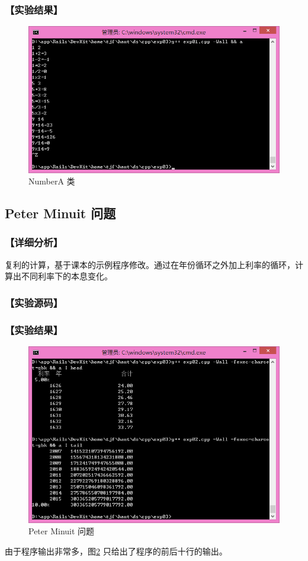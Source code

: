 \subsubsection*{【实验结果】}
\begin{figure}[htp]
\centering
\includegraphics[width=\textwidth]{exp03/exp01.png}
\caption{\label{out03_01}NumberA 类}
\end{figure}

\subsection{Peter Minuit 问题}
\subsubsection*{【详细分析】}
复利的计算，基于课本的示例程序修改。通过在年份循环之外加上利率的循环，计算出不同利率下的本息变化。
\subsubsection*{【实验源码】}
{\linespread{1}}
\subsubsection*{【实验结果】}
\begin{figure}[htp]
\centering
\includegraphics[width=\textwidth]{exp03/exp02.png}
\caption{\label{out03_02}Peter Minuit 问题}
\end{figure}
由于程序输出非常多，图\ref{out03_02} 只给出了程序的前后十行的输出。

